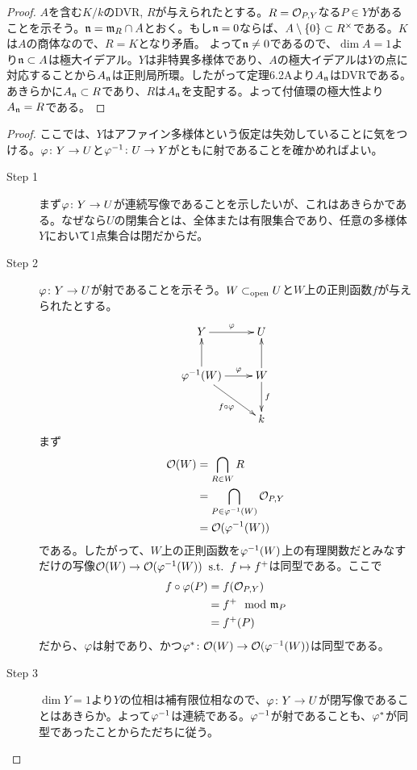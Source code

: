 \begin{proof}
  $A$を含む$K/k$のDVR, $R$が与えられたとする。$R = \mathcal{O}_{P,Y}$なる$P \in Y$があることを示そう。$\mathfrak{n} = \mathfrak{m}_R \cap A$とおく。もし$\mathfrak{n} = 0$ならば、$A \setminus \{0\} \subset R^{\times}$である。$K$は$A$の商体なので、$R = K$となり矛盾。
  よって$\mathfrak{n} \neq 0$であるので、$\dim A = 1$より$\mathfrak{n} \subset A$は極大イデアル。$Y$は非特異多様体であり、$A$の極大イデアルは$Y$の点に対応することから$A_{\mathfrak{n}}$は正則局所環。したがって定理6.2Aより$A_{\mathfrak{n}}$はDVRである。あきらかに$A_{\mathfrak{n}} \subset R$であり、$R$は$A_{\mathfrak{n}}$を支配する。よって付値環の極大性より$A_{\mathfrak{n}} = R$である。
\end{proof}



\begin{proof}
  ここでは、$Y$はアファイン多様体という仮定は失効していることに気をつける。${\varphi} \colon Y \to U$と${\varphi}^{-1} \colon U \to Y$がともに射であることを確かめればよい。
  \begin{description}
    \item[Step 1] まず${\varphi} \colon Y \to U$が連続写像であることを示したいが、これはあきらかである。なぜなら$U$の閉集合とは、全体または有限集合であり、任意の多様体$Y$において1点集合は閉だからだ。
    \item[Step 2] ${\varphi} \colon Y \to U$が射であることを示そう。$W \subset_{\text{open}} U$と$W$上の正則函数$f$が与えられたとする。
    \[
\xymatrix{
Y \ar[r]^-{\vp} & U \\
\vp^{-1}(W) \ar[dr]_-{f \circ \vp} \ar[u] \ar[r]^-{\vp} & W \ar[u] \ar[d]^-f \\
{} & k
}
    \]
    まず
    \begin{align*}
      \mathcal{O}(W) &= \bigcap_{R \in W} R \\
      &= \bigcap_{P \in {\varphi}^{-1}(W)} \mathcal{O}_{P,Y} \\
      &= \mathcal{O} ({\varphi}^{-1}(W))
    \end{align*}
    である。したがって、$W$上の正則函数を${\varphi}^{-1}(W)$上の有理関数だとみなすだけの写像$\mathcal{O}(W) \to \mathcal{O}({\varphi}^{-1}(W)) \; \; \text{s.t.} \; \; f \mapsto f^{+}$は同型である。ここで
    \begin{align*}
      f \circ {\varphi} (P) &= f(\mathcal{O}_{P,Y}) \\
      &= f^{+} \mod {\mathfrak{m}}_P \\
      &= f^{+} (P)
    \end{align*}
    だから、${\varphi}$は射であり、かつ${\varphi}^{*} \colon \mathcal{O}(W) \to \mathcal{O}({\varphi}^{-1}(W))$は同型である。
    \item[Step 3] $\dim Y = 1$より$Y$の位相は補有限位相なので、${\varphi} \colon Y \to U$が閉写像であることはあきらか。よって${\varphi}^{-1}$は連続である。${\varphi}^{-1}$が射であることも、${\varphi}^*$が同型であったことからただちに従う。
  \end{description}
\end{proof}



